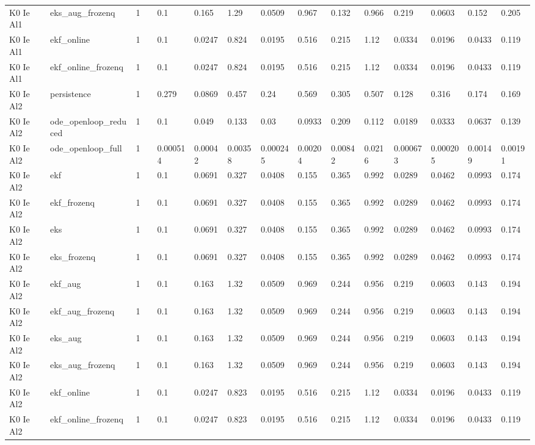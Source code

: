 \begin{table}[t]
\begin{tabular}{lllllllllllllll}
K0 Ie Al1 & eks\_aug\_frozenq & 1 &  & 0.1 & 0.165 & 1.29 & 0.0509 & 0.967 & 0.132 & 0.966 & 0.219 & 0.0603 & 0.152 & 0.205 \\
K0 Ie Al1 & ekf\_online & 1 &  & 0.1 & 0.0247 & 0.824 & 0.0195 & 0.516 & 0.215 & 1.12 & 0.0334 & 0.0196 & 0.0433 & 0.119 \\
K0 Ie Al1 & ekf\_online\_frozenq & 1 &  & 0.1 & 0.0247 & 0.824 & 0.0195 & 0.516 & 0.215 & 1.12 & 0.0334 & 0.0196 & 0.0433 & 0.119 \\
K0 Ie Al2 & persistence & 1 &  & 0.279 & 0.0869 & 0.457 & 0.24 & 0.569 & 0.305 & 0.507 & 0.128 & 0.316 & 0.174 & 0.169 \\
K0 Ie Al2 & ode\_openloop\_reduced & 1 &  & 0.1 & 0.049 & 0.133 & 0.03 & 0.0933 & 0.209 & 0.112 & 0.0189 & 0.0333 & 0.0637 & 0.139 \\
K0 Ie Al2 & ode\_openloop\_full & 1 &  & 0.000514 & 0.00042 & 0.00358 & 0.000245 & 0.00204 & 0.00842 & 0.0216 & 0.000673 & 0.000205 & 0.00149 & 0.00191 \\
K0 Ie Al2 & ekf & 1 &  & 0.1 & 0.0691 & 0.327 & 0.0408 & 0.155 & 0.365 & 0.992 & 0.0289 & 0.0462 & 0.0993 & 0.174 \\
K0 Ie Al2 & ekf\_frozenq & 1 &  & 0.1 & 0.0691 & 0.327 & 0.0408 & 0.155 & 0.365 & 0.992 & 0.0289 & 0.0462 & 0.0993 & 0.174 \\
K0 Ie Al2 & eks & 1 &  & 0.1 & 0.0691 & 0.327 & 0.0408 & 0.155 & 0.365 & 0.992 & 0.0289 & 0.0462 & 0.0993 & 0.174 \\
K0 Ie Al2 & eks\_frozenq & 1 &  & 0.1 & 0.0691 & 0.327 & 0.0408 & 0.155 & 0.365 & 0.992 & 0.0289 & 0.0462 & 0.0993 & 0.174 \\
K0 Ie Al2 & ekf\_aug & 1 &  & 0.1 & 0.163 & 1.32 & 0.0509 & 0.969 & 0.244 & 0.956 & 0.219 & 0.0603 & 0.143 & 0.194 \\
K0 Ie Al2 & ekf\_aug\_frozenq & 1 &  & 0.1 & 0.163 & 1.32 & 0.0509 & 0.969 & 0.244 & 0.956 & 0.219 & 0.0603 & 0.143 & 0.194 \\
K0 Ie Al2 & eks\_aug & 1 &  & 0.1 & 0.163 & 1.32 & 0.0509 & 0.969 & 0.244 & 0.956 & 0.219 & 0.0603 & 0.143 & 0.194 \\
K0 Ie Al2 & eks\_aug\_frozenq & 1 &  & 0.1 & 0.163 & 1.32 & 0.0509 & 0.969 & 0.244 & 0.956 & 0.219 & 0.0603 & 0.143 & 0.194 \\
K0 Ie Al2 & ekf\_online & 1 &  & 0.1 & 0.0247 & 0.823 & 0.0195 & 0.516 & 0.215 & 1.12 & 0.0334 & 0.0196 & 0.0433 & 0.119 \\
K0 Ie Al2 & ekf\_online\_frozenq & 1 &  & 0.1 & 0.0247 & 0.823 & 0.0195 & 0.516 & 0.215 & 1.12 & 0.0334 & 0.0196 & 0.0433 & 0.119 \\

\end{tabular}
\end{table}
